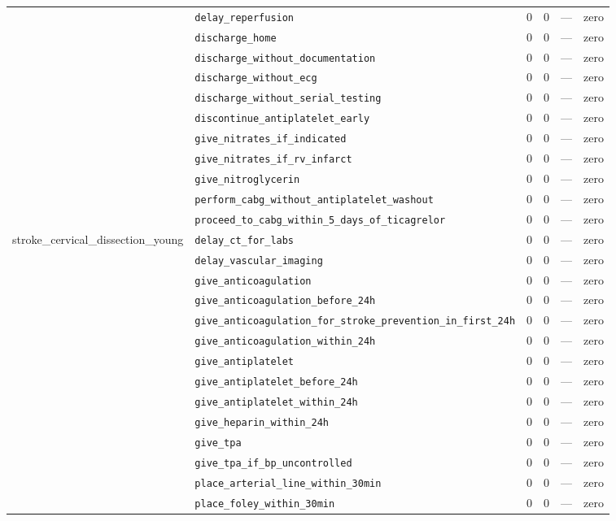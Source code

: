 \begin{table}[ht]
\begin{tabular}{llrrrl}
 & \texttt{delay\_reperfusion} & 0 & 0 & — & zero \\
 & \texttt{discharge\_home} & 0 & 0 & — & zero \\
 & \texttt{discharge\_without\_documentation} & 0 & 0 & — & zero \\
 & \texttt{discharge\_without\_ecg} & 0 & 0 & — & zero \\
 & \texttt{discharge\_without\_serial\_testing} & 0 & 0 & — & zero \\
 & \texttt{discontinue\_antiplatelet\_early} & 0 & 0 & — & zero \\
 & \texttt{give\_nitrates\_if\_indicated} & 0 & 0 & — & zero \\
 & \texttt{give\_nitrates\_if\_rv\_infarct} & 0 & 0 & — & zero \\
 & \texttt{give\_nitroglycerin} & 0 & 0 & — & zero \\
 & \texttt{perform\_cabg\_without\_antiplatelet\_washout} & 0 & 0 & — & zero \\
 & \texttt{proceed\_to\_cabg\_within\_5\_days\_of\_ticagrelor} & 0 & 0 & — & zero \\
\midrule
stroke\_cervical\_dissection\_young & \texttt{delay\_ct\_for\_labs} & 0 & 0 & — & zero \\
 & \texttt{delay\_vascular\_imaging} & 0 & 0 & — & zero \\
 & \texttt{give\_anticoagulation} & 0 & 0 & — & zero \\
 & \texttt{give\_anticoagulation\_before\_24h} & 0 & 0 & — & zero \\
 & \texttt{give\_anticoagulation\_for\_stroke\_prevention\_in\_first\_24h} & 0 & 0 & — & zero \\
 & \texttt{give\_anticoagulation\_within\_24h} & 0 & 0 & — & zero \\
 & \texttt{give\_antiplatelet} & 0 & 0 & — & zero \\
 & \texttt{give\_antiplatelet\_before\_24h} & 0 & 0 & — & zero \\
 & \texttt{give\_antiplatelet\_within\_24h} & 0 & 0 & — & zero \\
 & \texttt{give\_heparin\_within\_24h} & 0 & 0 & — & zero \\
 & \texttt{give\_tpa} & 0 & 0 & — & zero \\
 & \texttt{give\_tpa\_if\_bp\_uncontrolled} & 0 & 0 & — & zero \\
 & \texttt{place\_arterial\_line\_within\_30min} & 0 & 0 & — & zero \\
 & \texttt{place\_foley\_within\_30min} & 0 & 0 & — & zero \\

\end{tabular}
\end{table}
